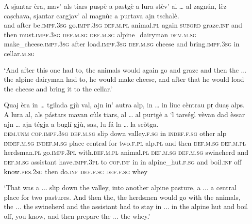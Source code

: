 \begin{linenumbers}
	\gll A sjantar èra, mav’ als tiars puspè a pastgè a lura stèv’ al … al zagnún, lèz caṣchava, sjantar cargjav’ al magnùc a purtava ajn tschalè.   \\
	and after be.\textsc{impf.3sg} go.\textsc{impf.3sg} \textsc{def.m.pl} animal.\textsc{pl} again \textsc{subord} graze.\textsc{inf} and then must.\textsc{impf.3sg} \textsc{def.m.sg} {} \textsc{def.m.sg} alpine\_dairyman \textsc{dem.m.sg} make\_cheese\textsc{.impf.3sg} after load.\textsc{impf.3sg} \textsc{def.m.sg} cheese and bring.\textsc{impf.3sg} in cellar.\textsc{m.sg}\\
\end{linenumbers}
\medskip
\glt `And after this one had to, the animals would again go and graze and then the ... the alpine dairyman had to, he would make cheese, and after that he would load the cheese and bring it to the cellar.'
\medskip

\begin{linenumbers}
	\gll  Quaj èra in … tgilada  gjù val, ajn in' autra alp, in … in liuc cèntrau pr̩ duaṣ alps. A lura al, als pástars mavan cùls tiars, al … al  purtgè a ‘l tarségl vèvan dad èssar ajn … ajn tégja a buglí gjù, sas, lu fá la … la scòtga.\\
	\textsc{dem.unm} \textsc{cop.impf.3sg} \textsc{def.m.sg} {} slip down valley.\textsc{f.sg} in \textsc{indef.f.sg} other alp \textsc{indef.m.sg} {} \textsc{indef.m.sg} place central for two.\textsc{f.pl} alp.\textsc{pl} and then \textsc{def.m.sg} \textsc{def.m.pl} herdsman.\textsc{pl} go.\textsc{impf.3pl} with.\textsc{def.m.pl} animal.\textsc{pl} \textsc{def.m.sg} {} \textsc{def.m.sg} swineherd and \textsc{def.m.sg} assistant have.\textsc{impf.3pl} to \textsc{cop.inf} in {} in alpine\_hut.\textsc{f.sg} and boil.\textsc{inf} off know.\textsc{prs.2sg} then do.\textsc{inf} \textsc{def.f.sg} {} \textsc{def.f.sg} whey  \\
\end{linenumbers}
\medskip
\glt `That was a ... slip down the valley, into another alpine pasture, a ... a central place for two pastures. And then the, the herdsmen would go with the animals, the ... the swineherd and the assistant had to stay in ... in the alpine hut and boil off, you know, and then prepare the ... the whey.'
\medskip

